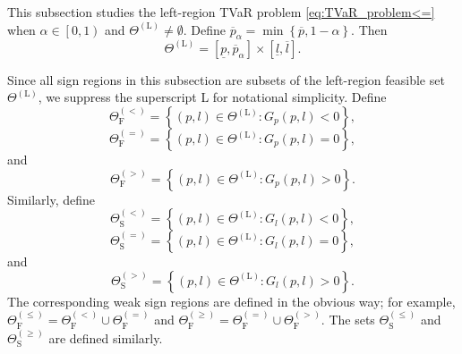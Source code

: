 \documentclass[a4paper,12pt]{article}
\begin{document}
This subsection studies the left-region TVaR problem \eqref{eq:TVaR_problem<=} when $\alpha\in\left[0,1\right)$ and $\Theta^{\left(\text{L}\right)}\neq\emptyset$. Define $\overline{p}_{\alpha}=\min\left\{\overline{p},1-\alpha\right\}$. Then
\begin{equation*}
\Theta^{\left(\text{L}\right)}=\left[\underline{p},\overline{p}_{\alpha}\right]\times\left[\underline{l},\overline{l}\right].
\end{equation*}

Since all sign regions in this subsection are subsets of the left-region feasible set $\Theta^{\left(\text{L}\right)}$, we suppress the superscript L for notational simplicity. Define
\begin{equation*}
\Theta_{\text{F}}^{\left(<\right)}=\left\{\left(p,l\right)\in\Theta^{\left(\text{L}\right)}:G_p\left(p,l\right)<0\right\},
\end{equation*}
\begin{equation*}
\Theta_{\text{F}}^{\left(=\right)}=\left\{\left(p,l\right)\in\Theta^{\left(\text{L}\right)}:G_p\left(p,l\right)=0\right\},
\end{equation*}
and
\begin{equation*}
\Theta_{\text{F}}^{\left(>\right)}=\left\{\left(p,l\right)\in\Theta^{\left(\text{L}\right)}:G_p\left(p,l\right)>0\right\}.
\end{equation*}
Similarly, define
\begin{equation*}
\Theta_{\text{S}}^{\left(<\right)}=\left\{\left(p,l\right)\in\Theta^{\left(\text{L}\right)}:G_l\left(p,l\right)<0\right\},
\end{equation*}
\begin{equation*}
\Theta_{\text{S}}^{\left(=\right)}=\left\{\left(p,l\right)\in\Theta^{\left(\text{L}\right)}:G_l\left(p,l\right)=0\right\},
\end{equation*}
and
\begin{equation*}
\Theta_{\text{S}}^{\left(>\right)}=\left\{\left(p,l\right)\in\Theta^{\left(\text{L}\right)}:G_l\left(p,l\right)>0\right\}.
\end{equation*}
The corresponding weak sign regions are defined in the obvious way; for example, $\Theta_{\text{F}}^{\left(\leq\right)}=\Theta_{\text{F}}^{\left(<\right)}\cup\Theta_{\text{F}}^{\left(=\right)}$ and $\Theta_{\text{F}}^{\left(\geq\right)}=\Theta_{\text{F}}^{\left(=\right)}\cup\Theta_{\text{F}}^{\left(>\right)}$. The sets $\Theta_{\text{S}}^{\left(\leq\right)}$ and $\Theta_{\text{S}}^{\left(\geq\right)}$ are defined similarly.
\end{document}
